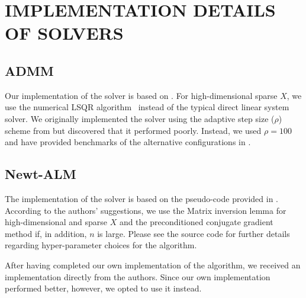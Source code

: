 \section{IMPLEMENTATION DETAILS OF SOLVERS}
\label{sec:solver-details}

\subsection{ADMM}

Our implementation of the solver is based on \textcite{boyd2011}.
For high-dimensional sparse \(X\), we use the numerical LSQR algorithm~\parencite{paige1982} instead of the typical direct linear system solver.
We originally implemented the solver using the adaptive step size (\(\rho\)) scheme from \textcite{boyd2010} but discovered that it performed poorly.
Instead, we used \(\rho = 100\) and have provided benchmarks of the alternative configurations in .

\subsection{Newt-ALM}

The implementation of the solver is based on the pseudo-code provided in \textcite{Ziyan2019}.
According to the authors' suggestions, we use the Matrix inversion lemma for high-dimensional and sparse \(X\) and the preconditioned conjugate gradient method if, in addition, \(n\) is large.
Please see the source code for further details regarding hyper-parameter choices for the algorithm.

After having completed our own implementation of the algorithm, we received an implementation directly from the authors.
Since our own implementation performed better, however, we opted to use it instead.

